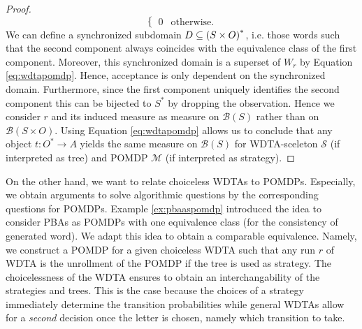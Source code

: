 \begin{proof}
\begin{equation}
\begin{cases}
      0 &\text{otherwise}.
    \end{cases}
    \label{eq:wdtapomdp}
  \end{equation}
  We can define a synchronized subdomain $D\subseteq \left(S\times O\right)^{*}$,
  i.e. those words such that the second component always coincides with the
  equivalence class of the first component. Moreover, this synchronized domain
  is a superset of $W_{r}$ by Equation \ref{eq:wdtapomdp}. Hence, acceptance is
  only dependent on the synchronized domain. Furthermore, since the first
  component uniquely identifies the second component this can be bijected to
  $S^{*}$ by dropping the observation. Hence we consider $r$ and its induced
  measure as measure on $\mathcal{B}(S)$ rather than on
  $\mathcal{B}(S\times O)$. Using Equation \ref{eq:wdtapomdp} allows us to
  conclude that any object $t:O^{*}\rightarrow A$ yields the same measure on
  $\mathcal{B}(S)$ for \ac{WDTA}-sceleton $\mathcal{S}$ (if interpreted as
  tree) and \ac{POMDP} $\mathcal{M}$ (if interpreted as strategy).
\end{proof}

On the other hand, we want to relate choiceless \acp{WDTA} to \acp{POMDP}.
Especially, we obtain arguments to solve algorithmic questions by the
corresponding questions for \acp{POMDP}. Example \ref{ex:pbaaspomdp} introduced
the idea to consider \acp{PBA} as \acp{POMDP} with one equivalence class (for
the consistency of generated word). We adapt this idea to obtain a comparable
equivalence. Namely, we construct a \ac{POMDP} for a given choiceless \ac{WDTA}
such that any run $r$ of \ac{WDTA} is the unrollment of the \ac{POMDP} if the
tree is used as strategy. The choicelessness of the \ac{WDTA} ensures to obtain
an interchangability of the strategies and trees. This is the case because the
choices of a strategy immediately determine the transition probabilities while
general \acp{WDTA} allow for a \emph{second} decision once the letter is
chosen, namely which transition to take.

